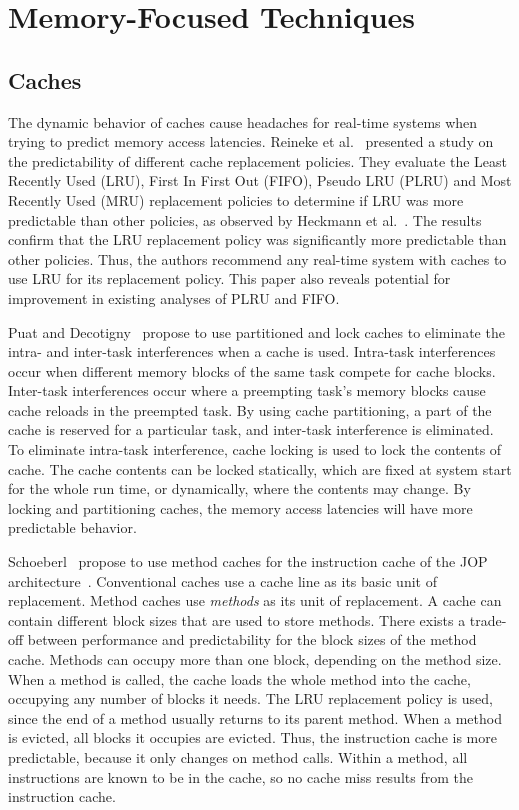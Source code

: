 \section{Memory-Focused Techniques}
\subsection{Caches}
The dynamic behavior of caches cause headaches for real-time systems when trying to predict memory access latencies.
Reineke et al.~\cite{Reineke07TimingPredictability} presented a study on the predictability of different cache replacement policies.
They evaluate the Least Recently Used (LRU), First In First Out (FIFO), Pseudo LRU (PLRU) and Most Recently Used (MRU) replacement policies to determine if LRU was more predictable than other policies, as observed by Heckmann et al.~\cite{Heckmann2003processor}.    
The results confirm that the LRU replacement policy was significantly more predictable than other policies.
Thus, the authors recommend any real-time system with caches to use LRU for its replacement policy. 
This paper also reveals potential for improvement in existing analyses of PLRU and FIFO.

Puat and Decotigny~\cite{Puaut02} propose to use partitioned and lock caches to eliminate the intra- and inter-task interferences when a cache is used. 
Intra-task interferences occur when different memory blocks of the same task compete for cache blocks.
Inter-task interferences occur where a preempting task's memory blocks cause cache reloads in the preempted task.
By using cache partitioning, a part of the cache is reserved for a particular task, and inter-task interference is eliminated.
To eliminate intra-task interference, cache locking is used to lock the contents of cache.
The cache contents can be locked statically, which are fixed at system start for the whole run time, or dynamically, where the contents may change.   
By locking and partitioning caches, the memory access latencies will have more predictable behavior. 

Schoeberl~\cite{jop:jtres_cache} propose to use method caches for the instruction cache of the JOP architecture~\cite{jop:wcet}.
Conventional caches use a cache line as its basic unit of replacement. 
Method caches use \emph{methods} as its unit of replacement. 
A cache can contain different block sizes that are used to store methods. 
There exists a trade-off between performance and predictability for the block sizes of the method cache. 
Methods can occupy more than one block, depending on the method size. 
When a method is called, the cache loads the whole method into the cache, occupying any number of blocks it needs.
The LRU replacement policy is used, since the end of a method usually returns to its parent method. 
When a method is evicted, all blocks it occupies are evicted. 
Thus, the instruction cache is more predictable, because it only changes on method calls. 
Within a method, all instructions are known to be in the cache, so no cache miss results from the instruction cache.
 
